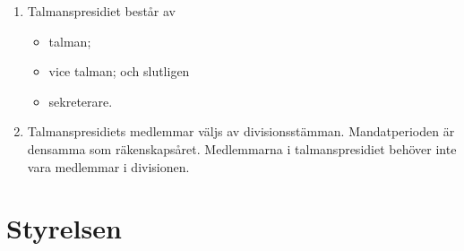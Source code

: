 \documentclass{dvd}
\begin{document}
	\begin{enumerate}[label=\arabic* §, ref=\arabic*]
		\item Talmanspresidiet består av

		\begin{itemize}
			\item talman;
			\item vice talman; och slutligen
			\item sekreterare.
		\end{itemize}

		\item Talmanspresidiets medlemmar väljs av divisionsstämman.
		Mandatperioden är densamma som räkenskapsåret.
		Medlemmarna i talmanspresidiet behöver inte vara medlemmar i divisionen.
	\end{enumerate}

	\section{Styrelsen}
\end{document}
